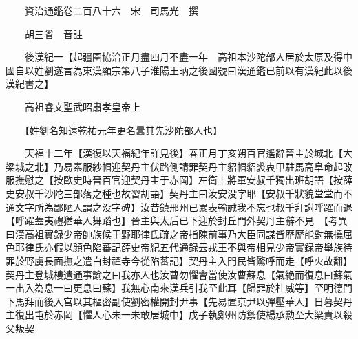 










 


 
 


 

  
  
  
  
  





  
  
  
  
  
 
  

  

  
  
  



  

 
 

  
   




  

  
  


  　　資治通鑑卷二百八十六　宋　司馬光　撰

　　胡三省　音註

　　後漢紀一【起疆圉協洽正月盡四月不盡一年　高祖本沙陀部人居於太原及得中國自以姓劉遂言為東漢顯宗第八子淮陽王昞之後國號曰漢通鑑已前以有漢紀此以後漢紀書之】

　　高祖睿文聖武昭肅孝皇帝上

　　【姓劉名知遠乾祐元年更名暠其先沙陀部人也】

　　天福十二年【漢復以天福紀年詳見後】春正月丁亥朔百官遙辭晉主於城北【大梁城之北】乃易素服紗帽迎契丹主伏路側請罪契丹主貂帽貂裘衷甲駐馬高阜命起改服撫慰之【按歐史時晉百官迎契丹主于赤岡】左衛上將軍安叔千獨出班胡語【按薛史安叔千沙陀三部落之種也故習胡語】契丹主曰汝安没字耶【安叔千狀貌堂堂而不通文字所為鄙陋人謂之没字碑】汝昔鎮邢州已累表輸誠我不忘也叔千拜謝呼躍而退【呼躍蓋夷禮猶華人舞蹈也】晉主與太后已下迎於封丘門外契丹主辭不見　【考異曰漢高祖實録少帝帥族候于野耶律氏疏之帝指陳前事乃大臣同謀皆歷歷能對無撓屈色耶律氏亦假以顔色陷蕃記薛史帝紀五代通録云戎王不與帝相見少帝實録帝舉族待罪於野虜長面撫之遣白封禪寺今從陷蕃記】契丹主入門民皆驚呼而走【呼火故翻】契丹主登城樓遣通事諭之曰我亦人也汝曹勿懼會當使汝曹蘇息【氣絶而復息曰蘇氣一出入為息一曰更息曰蘇】我無心南來漢兵引我至此耳【歸罪於杜威等】至明德門下馬拜而後入宫以其樞密副使劉密權開封尹事【先易置京尹以彈壓華人】日暮契丹主復出屯於赤岡【懼人心未一未敢居城中】戊子執鄭州防禦使楊承勲至大梁責以殺父叛契

